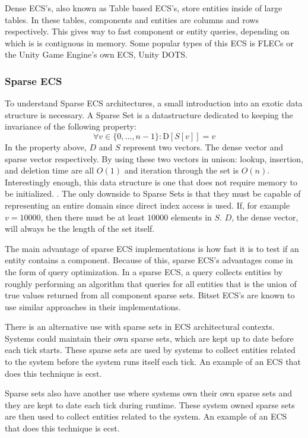 Dense ECS's, also known as Table based ECS's, store entities inside of large tables. In these tables, components and entities are columns and rows respectively. This gives way to fast component or entity queries, depending on which is is contiguous in memory. Some popular types of this ECS is FLECs or the Unity Game Engine's own ECS, Unity DOTS. \cite{SanderMertensFAQ}

\subsubsection{Sparse ECS}
To understand Sparse ECS architectures, a small introduction into an exotic data structure is necessary. A Sparse Set is a datastructure dedicated to keeping the invariance of the following property:
\begin{equation*}
    \forall v \in \{0,\ldots, n-1\} : \text{D}[S[v]] = v
\end{equation*}
In the property above, $D$ and $S$ represent two vectors. The dense vector and sparse vector respectively. By using these two vectors in unison: lookup, insertion, and deletion time are all $O(1)$ and iteration through the set is $O(n)$. Interestingly enough, this data structure is one that does not require memory to be initialized. \cite{sparse_profit}. The only downside to Sparse Sets is that they must be capable of representing an entire domain since direct index access is used. If, for example $v = 10000$, then there must be at least $10000$ elements in $S$. $D$, the dense vector, will always be the length of the set itself.

The main advantage of sparse ECS implementations is how fast it is to test if an entity contains a component. Because of this, sparse ECS's advantages come in the form of query optimization. In a sparse ECS, a query collects entities by roughly performing an algorithm that queries for all entities that is the union of true values returned from all component sparse sets. Bitset ECS's are known to use similar approaches in their implementations.\cite{EnTT_SparseSets}

There is an alternative use with sparse sets in ECS architectural contexts. Systems could maintain their own sparse sets, which are kept up to date before each tick starts. These sparse sets are used by systems to collect entities related to the system before the system runs itself each tick. An example of an ECS that does this technique is ecst.

Sparse sets also have another use where systems own their own sparse sets and they are kept to date each tick during runtime. These system owned sparse sets are then used to collect entities related to the system. An example of an ECS that does this technique is ecst. \cite{ecst}

